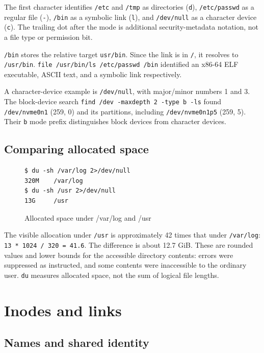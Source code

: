 \documentclass{../latex/utmreport}
\begin{document}
The first character identifies \texttt{/etc} and \texttt{/tmp} as
directories (\texttt{d}), \texttt{/etc/passwd} as a regular file
(\texttt{-}), \texttt{/bin} as a symbolic link (\texttt{l}), and
\texttt{/dev/null} as a character device (\texttt{c}). The trailing dot
after the mode is additional security-metadata notation, not a file type
or permission bit.

\texttt{/bin} stores the relative target \texttt{usr/bin}. Since the
link is in \texttt{/}, it resolves to \texttt{/usr/bin}.
\texttt{file\ /usr/bin/ls\ /etc/passwd\ /bin} identified an x86-64 ELF
executable, ASCII text, and a symbolic link respectively.

A character-device example is \texttt{/dev/null}, with major/minor
numbers 1 and 3. The block-device search
\texttt{find\ /dev\ -maxdepth\ 2\ -type\ b\ -ls} found
\texttt{/dev/nvme0n1} (259, 0) and its partitions, including
\texttt{/dev/nvme0n1p5} (259, 5). Their \texttt{b} mode prefix
distinguishes block devices from character devices.

\section{Comparing allocated space}\label{comparing-allocated-space}

\begin{figure}[H]
\begin{lstlisting}
$ du -sh /var/log 2>/dev/null
320M    /var/log
$ du -sh /usr 2>/dev/null
13G     /usr
\end{lstlisting}
\caption{Allocated space under /var/log and /usr}
\end{figure}

The visible allocation under \texttt{/usr} is approximately 42 times
that under \texttt{/var/log}: \texttt{13\ *\ 1024\ /\ 320\ =\ 41.6}. The
difference is about 12.7 GiB. These are rounded values and lower bounds
for the accessible directory contents: errors were suppressed as
instructed, and some contents were inaccessible to the ordinary user.
\texttt{du} measures allocated space, not the sum of logical file
lengths.

\chapter{Inodes and links}\label{inodes-and-links}

\section{Names and shared identity}\label{names-and-shared-identity}
\end{document}
